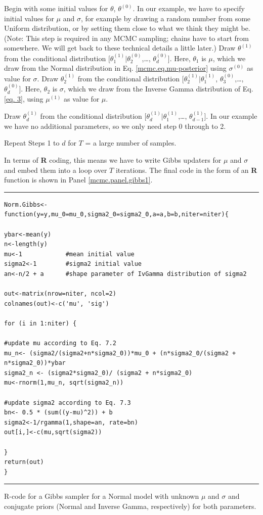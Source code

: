 { Begin with some initial values for $\theta$, $\theta^{(0)}$.}
In our example, we have to specify initial values for $\mu$ and $\sigma$, for
example by drawing a random number from some Uniform distribution, or
by setting them close to what we think they might be. (Note: This step
is required in any MCMC sampling; chains have to start from
somewhere. We will get back to these technical details a little
later.)
{ Draw $\theta^{(1)}$ from the conditional distribution $[\theta_{1}^{(1)}|\theta_{2}^{(0)}$,\ldots, $\theta_{d}^{(0)}]$. }
Here, $\theta_1$ is $\mu$, which we draw from the Normal distribution in Eq. \ref{mcmc.eq.mu-posterior}  using $\sigma^{(0)}$ as value for $\sigma$.
{ Draw $\theta_{2}^{(1)}$ from the conditional distribution $[\theta_{2}^{(1)}|\theta_{1}^{(1)}$, $\theta_{3}^{(0)}$,\ldots, $\theta_{d}^{(0)}]$. }
Here, $\theta_2$ is $\sigma$, which we draw from the Inverse Gamma
distribution of Eq. \ref{eq. 3}, using $\mu^{(1)}$ as value for $\mu$.

{ Draw $\theta_{d}^{(1)}$ from the conditional distribution $[\theta_{d}^{(1)}|\theta_{1}^{(1)}$,\ldots, $\theta_{d-1}^{(1)}]$. }
In our example we have no additional parameters, so we only need step 0 through to 2.

{\flushleft Repeat Steps 1 to $d$ for $T$ = a large number of samples.}

In terms of {\bf R} coding, this means we have to write Gibbs updaters for
$\mu$ and $\sigma$ and embed them into a loop over $T$ iterations. The final
code in the form of an {\bf R} function is shown 
in Panel \ref{mcmc.panel.gibbs1}.


\begin{panel}[htp]
\centering
\rule[0.15in]{\textwidth}{.03in}
\begin{verbatim}
Norm.Gibbs<-function(y=y,mu_0=mu_0,sigma2_0=sigma2_0,a=a,b=b,niter=niter){

ybar<-mean(y)
n<-length(y)
mu<-1            #mean initial value
sigma2<-1        #sigma2 initial value
an<-n/2 + a      #shape parameter of IvGamma distribution of sigma2

out<-matrix(nrow=niter, ncol=2)
colnames(out)<-c('mu', 'sig')

for (i in 1:niter) {

#update mu according to Eq. 7.2
mu_n<- (sigma2/(sigma2+n*sigma2_0))*mu_0 + (n*sigma2_0/(sigma2 + n*sigma2_0))*ybar 
sigma2_n <- (sigma2*sigma2_0)/ (sigma2 + n*sigma2_0)
mu<-rnorm(1,mu_n, sqrt(sigma2_n))

#update sigma2 according to Eq. 7.3
bn<- 0.5 * (sum((y-mu)^2)) + b
sigma2<-1/rgamma(1,shape=an, rate=bn)
out[i,]<-c(mu,sqrt(sigma2))

}
return(out)
}
\end{verbatim}
\rule[-0.15in]{\textwidth}{.03in}
\caption{
R-code for a Gibbs sampler for a Normal model with unknown $\mu$
and $\sigma$ and conjugate priors (Normal and Inverse Gamma, respectively) 
for both parameters.
}
\label{mcmc.panel.gibbs1}
\end{panel}

